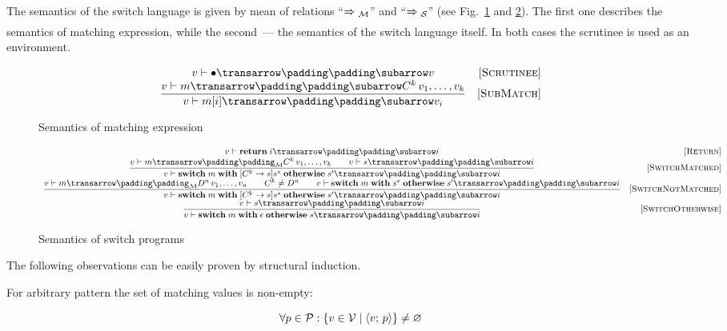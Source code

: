 The semantics of the switch language is given by mean of relations ``$\xRightarrow{}{}_{\mathcal M}$'' and ``$\xRightarrow{}{}_{\mathcal S}$''
(see Fig.~\ref{fig:matchexpr} and \ref{fig:test-and-branch}). The first one describes the semantics of matching expression, while
the second~--- the semantics of the switch language itself. In both cases the scrutinee is used as an environment.


\begin{figure}
  \renewcommand*{\arraystretch}{2}
  \setarrow{\xRightarrow}
  \[
  \begin{array}{cr}
    \withenv{v}{\trans{\bullet}{}{v}} & \ruleno{Scrutinee} \\
    \trule{\withenv{v}{\trans{m}{}{C^k\,v_1,\dots,v_k}}}{\withenv{v}{\trans{m[i]}{}{v_i}}} & \ruleno{SubMatch} 
  \end{array}
  \]
  \caption{Semantics of matching expression}
  \label{fig:matchexpr}
\end{figure}

\begin{figure}
  \renewcommand*{\arraystretch}{3}
  \setarrow{\xRightarrow}
  \[
  \begin{array}{cr}
    \withenv{v}{\trans{\primi{return}\;i}{}{i}} & \ruleno{Return}\\
    \trule{{\setsubarrow{_{\mathcal M}}\withenv{v}{\trans{m}{}{C^k\,v_1,\dots,v_k}}}\qquad \withenv{v}{\trans{s}{}{i}}}
          {\withenv{v}{\trans{\primi{switch}\;m\;\primi{with}\;[C^k\to s]s^*\;\primi{otherwise}\;s^\prime}{}{i}}} & \ruleno{SwitchMatched}\\
    \trule{{\setsubarrow{_{\mathcal M}}\withenv{v}{\trans{m}{}{D^n\,v_1,\dots,v_n}}}\qquad C^k\ne D^n\qquad \withenv{v}{\trans{\primi{switch}\;m\;\primi{with}\;s^*\;\primi{otherwise}\;s^\prime}{}{i}}}
          {\withenv{v}{\trans{\primi{switch}\;m\;\primi{with}\;[C^k\to s]s^*\;\primi{otherwise}\;s^\prime}{}{i}}} & \ruleno{SwitchNotMatched}\\
    \trule{\withenv{v}{\trans{s}{}{i}}}{\withenv{v}{\trans{\primi{switch}\;m\;\primi{with}\;\epsilon\;\primi{otherwise}\;s}{}{i}}} & \ruleno{SwitchOtherwise}
  \end{array}
  \]
  \caption{Semantics of switch programs}
  \label{fig:test-and-branch}
\end{figure}

The following observations can be easily proven by structural induction.

\begin{Observation}
  For arbitrary pattern the set of matching values is non-empty:

  \[
  \forall p\in\mathcal P : \{v\in\mathcal V\mid \left<{v;\,p}\right>\}\ne\varnothing
  \]
\end{Observation}

